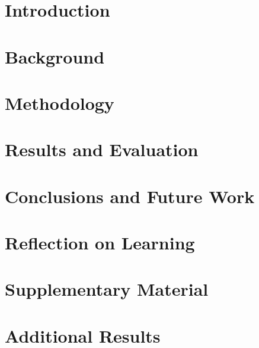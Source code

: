 \mainmatter

\chapter{Introduction}\label{ch1}


\chapter{Background}\label{ch2}


\chapter{Methodology}\label{ch3}


\chapter{Results and Evaluation}\label{ch4}


\chapter{Conclusions and Future Work}\label{ch5}


\chapter{Reflection on Learning}\label{ch6}


\backmatter

\appendix
\chapter{Supplementary Material}\label{app:supp}


\chapter{Additional Results}\label{app:results}


\cite{}


